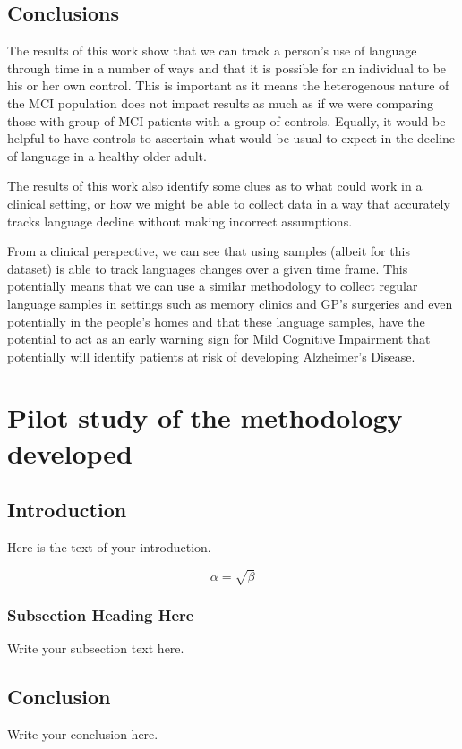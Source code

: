 \documentclass[10pt, letterpaper, twoside, openany]{thesis}
\begin{document}
\section{Conclusions}\label{conclusions}
The results of this work show that we can track a person's use of language through time in a number of ways and that it is possible for an individual to be his or her own control. This is important as it means the heterogenous nature of the MCI population does not impact results as much as if we were comparing those with group of MCI patients with a group of controls. Equally, it would be helpful to have controls to ascertain what would be usual to expect in the decline of language in a healthy older adult. 
\par 
The results of this work also identify some clues as to what could work in a clinical setting, or how we might be able to collect data in a way that accurately tracks language decline without making incorrect assumptions. 
\par
From a clinical perspective, we can see that using samples (albeit for this dataset) is able to track languages changes over a given time frame. This potentially means that we can use a similar methodology to collect regular language samples in settings such as memory clinics and GP's surgeries and even potentially in the people's homes and that these language samples, have the potential to act as an early warning sign for Mild Cognitive Impairment that potentially will identify patients at risk of developing Alzheimer's Disease.

\chapter{Pilot study of the methodology developed}
\section{Introduction}
Here is the text of your introduction.

\begin{equation}
    \label{simple_equation}
    \alpha = \sqrt{ \beta }
\end{equation}

\subsection{Subsection Heading Here}
Write your subsection text here.


\section{Conclusion}
Write your conclusion here.
\end{document}
